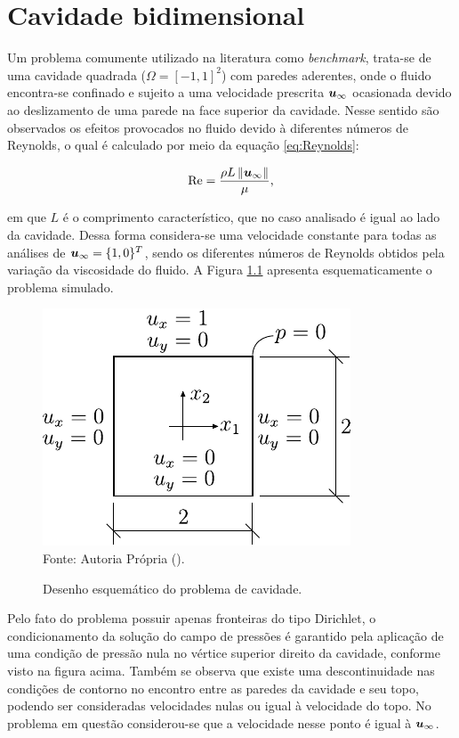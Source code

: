 \chapter[APÊNDICE \ref{Ap:Cavity}]{Cavidade bidimensional}
\label{Ap:Cavity}

Um problema comumente utilizado na literatura como \textit{benchmark}, trata-se de uma cavidade quadrada ($\Omega=[-1,1]^2$) com paredes aderentes, onde o fluido encontra-se confinado e sujeito a uma velocidade prescrita $\boldsymbol{u}_\infty$ ocasionada devido ao deslizamento de uma parede na face superior da cavidade. Nesse sentido são observados os efeitos provocados no fluido devido à diferentes números de Reynolds, o qual é calculado por meio da equação \eqref{eq:Reynolds}:

\begin{equation}
    \mathrm{Re}=\frac{\rho L\left\lVert{\boldsymbol{u}_\infty}\right\lVert}{\mu}\text{,}
    \label{eq:Reynolds}
\end{equation}

\noindent em que $L$ é o comprimento característico, que no caso analisado é igual ao lado da cavidade. Dessa forma considera-se uma velocidade constante para todas as análises de $\boldsymbol{u}_\infty=\{1,0\}^T$, sendo os diferentes números de Reynolds obtidos pela variação da viscosidade do fluido. A Figura \ref{fig:cavity} apresenta esquematicamente o problema simulado.

\begin{figure}[h!]
    \centering
    \caption{Desenho esquemático do problema de cavidade.}
    \includegraphics[width=.35\linewidth]{Figuras/Cavity/cavidade.pdf}
    \\Fonte: Autoria Própria (\the\year).
    \label{fig:cavity}
\end{figure}

Pelo fato do problema possuir apenas fronteiras do tipo Dirichlet, o condicionamento da solução do campo de pressões é garantido pela aplicação de uma condição de pressão nula no vértice superior direito da cavidade, conforme visto na figura acima.  Também se observa que existe uma descontinuidade nas condições de contorno no encontro entre as paredes da cavidade e seu topo, podendo ser consideradas velocidades nulas ou igual à velocidade do topo. No problema em questão considerou-se que a velocidade nesse ponto é igual à $\boldsymbol{u}_\infty$.

